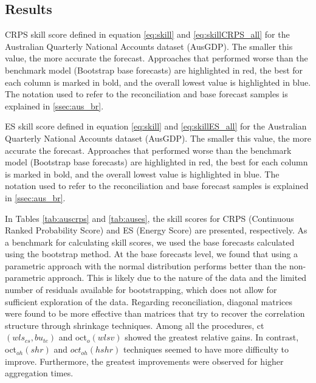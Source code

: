 \documentclass[a4paper,11pt]{article}
\theoremstyle{definition}
\begin{document}
\subsection{Results}

\begin{table}[!t]
	\centering
	\begingroup
	\fontsize{9}{11}\selectfont
	
	\endgroup
	\caption{CRPS skill score defined in equation \eqref{eq:skill} and \eqref{eq:skillCRPS_all} for the Australian Quarterly National Accounts dataset (AusGDP). The smaller this value, the more accurate the forecast. Approaches that performed worse than the benchmark model (Bootstrap base forecasts) are highlighted in red, the best for each column is marked in bold, and the overall lowest value is highlighted in blue. The notation used to refer to the reconciliation and base forecast samples is explained in \autoref{ssec:aus_br}.}
	\label{tab:auscrps}
\end{table}

\begin{table}[!ht]
	\centering
	\begingroup
	\fontsize{9}{11}\selectfont
	
	\endgroup
	\caption{ES skill score defined in equation \eqref{eq:skill} and \eqref{eq:skillES_all} for the Australian Quarterly National Accounts dataset (AusGDP). The smaller this value, the more accurate the forecast. Approaches that performed worse than the benchmark model (Bootstrap base forecasts) are highlighted in red, the best for each column is marked in bold, and the overall lowest value is highlighted in blue. The notation used to refer to the reconciliation and base forecast samples is explained in \autoref{ssec:aus_br}.}
	\label{tab:auses}
\end{table}

In Tables \ref{tab:auscrps} and \ref{tab:auses}, the skill scores for CRPS (Continuous Ranked Probability Score) and ES (Energy Score) are presented, respectively. As a benchmark for calculating skill scores, we used the base forecasts calculated using the bootstrap method.
At the base forecasts level, we found that using a parametric approach with the normal distribution performs better than the non-parametric approach. This is likely due to the nature of the data and the limited number of residuals available for bootstrapping, which does not allow for sufficient exploration of the data. Regarding reconciliation, diagonal matrices were found to be more effective than matrices that try to recover the correlation structure through shrinkage techniques. Among all the procedures, ct$(wls_{cs},bu_{te})$ and oct$_o(wlsv)$ showed the greatest relative gains. In contrast, oct$_{oh}(shr)$ and $oct_{oh}(hshr)$ techniques seemed to have more difficulty to improve. Furthermore, the greatest improvements were observed for higher aggregation times.
\end{document}
